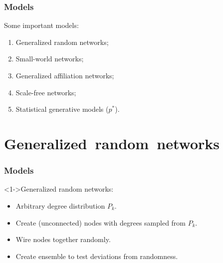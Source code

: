 


\begin{frame}
  \frametitle{Models}

  \begin{block}{Some important models:}
    \begin{enumerate}
    \item<2-> 
      Generalized random networks;
    \item<2-> 
      Small-world networks;
    \item<2-> 
      Generalized affiliation networks;
    \item<2-> 
      Scale-free networks;
    \item<2-> 
      Statistical generative models ($p^\ast$).
    \end{enumerate}
  \end{block}
  
\end{frame}

\section{Generalized\ random\ networks}

\begin{frame}
  \frametitle{Models}

  \begin{block}<1->{Generalized random networks:}
    \begin{itemize}
    \item<2-> Arbitrary degree distribution $P_k$.
    \item<3-> Create (unconnected) nodes with degrees sampled from $P_k$.
    \item<4-> Wire nodes together randomly.
    \item<5-> Create ensemble to test deviations from randomness.
    \end{itemize}
  \end{block}
  
\end{frame}

